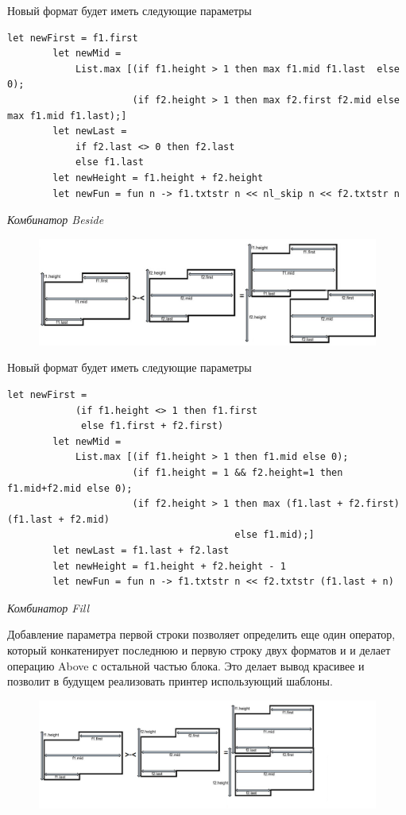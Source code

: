 \documentclass{matmex-diploma}
\begin{document}
Новый формат будет иметь следующие параметры
\begin{lstlisting}
let newFirst = f1.first
        let newMid = 
            List.max [(if f1.height > 1 then max f1.mid f1.last  else 0); 
                      (if f2.height > 1 then max f2.first f2.mid else max f1.mid f1.last);]
        let newLast = 
            if f2.last <> 0 then f2.last
            else f1.last
        let newHeight = f1.height + f2.height
        let newFun = fun n -> f1.txtstr n << nl_skip n << f2.txtstr n
\end{lstlisting}

\textit{Комбинатор Beside}

\begin{figure}[h]
	\includegraphics[scale=0.5]{Images/image07.png}
	\caption{}
\end{figure}
\newpage

Новый формат будет иметь следующие параметры

\begin{lstlisting}
let newFirst = 
            (if f1.height <> 1 then f1.first
             else f1.first + f2.first)
        let newMid = 
            List.max [(if f1.height > 1 then f1.mid else 0); 
                      (if f1.height = 1 && f2.height=1 then f1.mid+f2.mid else 0);
                      (if f2.height > 1 then max (f1.last + f2.first) (f1.last + f2.mid) 
                                        else f1.mid);]
        let newLast = f1.last + f2.last
        let newHeight = f1.height + f2.height - 1
        let newFun = fun n -> f1.txtstr n << f2.txtstr (f1.last + n)
\end{lstlisting}

\textit{Комбинатор Fill}

Добавление параметра первой строки позволяет определить еще один оператор, который конкатенирует последнюю и первую строку двух форматов и и делает операцию Above с остальной частью блока. Это делает вывод красивее и позволит в будущем реализовать принтер использующий шаблоны. 

\begin{figure}[h]
	\includegraphics[scale=0.5]{Images/image12.png}
	\caption{}
\end{figure}
\end{document}

